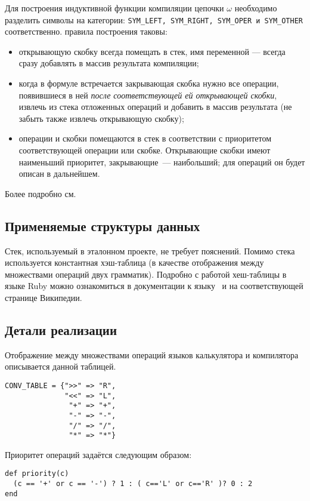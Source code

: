 Для построения индуктивной функции компиляции цепочки $\omega$ необходимо разделить
символы на категории: \verb|SYM_LEFT, SYM_RIGHT, SYM_OPER и SYM_OTHER| соответственно.
правила построения таковы:
\begin{itemize}
  \item открывающую скобку всегда помещать в стек, имя переменной --- всегда
  сразу добавлять в массив результата компиляции;
  \item когда в формуле встречается закрывающая скобка нужно все операции,
  появившиеся в ней \emph{после соответствующей ей открывающей скобки}, извлечь
  из стека отложенных операций и добавить в массив результата
  (не забыть также извлечь открывающую скобку);
  \item операции и скобки помещаются в стек в соответствии с приоритетом
  соответствующей операции или скобке. Открывающие скобки имеют наименьший приоритет,
  закрывающие~--- наибольший; для операций он будет описан в дальнейшем.
\end{itemize}
Более подробно см. \cite{compf}

\subsection{Применяемые структуры данных}
Стек, используемый в эталонном проекте, не требует пояснений.
Помимо стека используется константная хэш-таблица (в качестве отображения
между множествами операций двух грамматик). Подробно с работой хеш-таблицы в языке
Ruby можно ознакомиться в документации к языку~\cite{rubydoc} и на соответствующей
странице Википедии.

\subsection{Детали реализации}

Отображение между множествами операций языков калькулятора и компилятора описывается
данной таблицей.
\begin{lstlisting}
CONV_TABLE = {">>" => "R",
              "<<" => "L",
               "+" => "+",
               "-" => "-",
               "/" => "/",
               "*" => "*"}
\end{lstlisting}

Приоритет операций задаётся следующим образом:
\begin{lstlisting}
def priority(c)
  (c == '+' or c == '-') ? 1 : ( c=='L' or c=='R' )? 0 : 2
end
\end{lstlisting}

